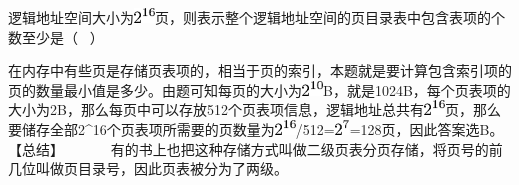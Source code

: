 逻辑地址空间大小为\includegraphics[width=0.21875in,height=0.15625in]{texmath/0180d65Cdpi7B3507D25E7B167D}页，则表示整个逻辑地址空间的页目录表中包含表项的个数至少是（
~）
\par{}
\begin{solution}在内存中有些页是存储页表项的，相当于页的索引，本题就是要计算包含索引项的页的数量最小值是多少。由题可知每页的大小为\includegraphics[width=0.21875in,height=0.15625in]{texmath/e0c3285Cdpi7B3507D25E7B107D}B，就是1024B，每个页表项的大小为2B，那么每页中可以存放512个页表项信息，逻辑地址总共有\includegraphics[width=0.21875in,height=0.15625in]{texmath/0180d65Cdpi7B3507D25E7B167D}页，那么要储存全部2\^{}16个页表项所需要的页数量为\includegraphics[width=0.21875in,height=0.15625in]{texmath/0180d65Cdpi7B3507D25E7B167D}/512=\includegraphics[width=0.15625in,height=0.15625in]{texmath/9558dc5Cdpi7B3507D25E7B77D}=128页，因此答案选B。
【总结】 ~ ~ ~
~有的书上也把这种存储方式叫做二级页表分页存储，将页号的前几位叫做页目录号，因此页表被分为了两级。
\end{solution}
